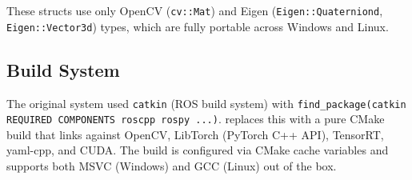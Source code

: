 These structs use only OpenCV (\texttt{cv::Mat}) and Eigen
(\texttt{Eigen::Quaterniond}, \texttt{Eigen::Vector3d}) types, which are
fully portable across Windows and Linux.

\subsection{Build System}

The original system used \texttt{catkin} (ROS build system) with
\texttt{find\_package(catkin REQUIRED COMPONENTS roscpp rospy ...)}.
\winlic{} replaces this with a pure CMake build that links against
OpenCV, LibTorch (PyTorch C++ API), TensorRT, yaml-cpp, and CUDA.
The build is configured via CMake cache variables and supports both
MSVC (Windows) and GCC (Linux) out of the box.
